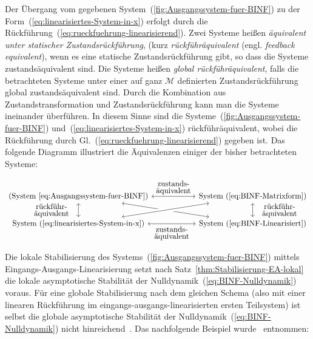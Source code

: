Der Übergang vom gegebenen System~(\ref{fig:Ausgangssystem-fuer-BINF})
zu der Form~(\ref{eq:linearisiertes-System-in-x}) erfolgt durch
die Rück\-führung~(\ref{eq:rueckfuehrung-linearisierend}). Zwei
Systeme heißen \emph{äquivalent unter statischer Zustandsrückführung},
(kurz \emph{rück\-führ\-äquivalent}
(engl. \emph{feed\-back equivalent}), wenn es eine statische Zustandsrückführung
gibt, so dass die Systeme zustandsäquivalent sind. Die Systeme heißen
\emph{global rück\-führ\-äquivalent}, falls die betrachteten Systeme
unter einer auf ganz $\mathcal{M}$ definierten Zustandsrückführung
global zustands\-äquivalent sind. Durch die Kombination aus Zustandstransformation
und Zustandsrückführung kann man die Systeme ineinander überführen.
In diesem Sinne sind die Systeme~(\ref{fig:Ausgangssystem-fuer-BINF})
und~(\ref{eq:linearisiertes-System-in-x}) rückführäquivalent, wobei
die Rückführung durch Gl.~(\ref{eq:rueckfuehrung-linearisierend})
gegeben ist. Das folgende Diagramm illustriert die Äquivalenzen einiger
der bisher betrachteten Systeme:

\[
\begin{tikzcd}
\text{(System~\ref{eq:Ausgangssystem-fuer-BINF})} 
\arrow[leftrightarrow]{rr}[above]{\stackrel{\textstyle\text{zustands-}}{\textstyle\text{äquivalent}}} 
\arrow[leftrightarrow]{d}[left]{\stackrel{\textstyle\text{rückführ-}}{\textstyle\text{äquivalent}}\quad} \arrow[rrd, leftrightarrow] 
& {} & \text{System~(\ref{eq:BINF-Matrixform})} 
\arrow[leftrightarrow]{d}[right]{\quad\stackrel{\textstyle\text{rückführ-}}{\textstyle\text{äquivalent}}}
\arrow[lld, leftrightarrow, crossing over]\\ 
\text{System~(\ref{eq:linearisiertes-System-in-x})} 
\arrow[leftrightarrow]{rr}[below]{\stackrel{\textstyle\text{zustands-}}{\textstyle\text{äquivalent}}} 
& {} & \text{System~(\ref{eq:BINF-Linearisiert})}
\end{tikzcd}
\]

Die lokale Stabilisierung des Systems~(\ref{fig:Ausgangssystem-fuer-BINF})
mittels Eingangs-Ausgangs-Linearisierung setzt nach Satz~\ref{thm:Stabilisierung-EA-lokal}
die lokale asymptotische Stabilität der Nulldynamik~(\ref{eq:BINF-Nulldynamik})
voraus. Für eine globale Stabilisierung nach dem gleichen Schema (also
mit einer linearen Rückführung im eingangs-ausgangs-linearisierten
ersten Teilsystem) ist selbst die globale asymptotische Stabilität
der Nulldynamik~(\ref{eq:BINF-Nulldynamik}) nicht hinreichend~\cite{sussmann1990}.
Das nachfolgende Beispiel wurde~\cite[Example~{4.2}]{sepulchre97}
entnommen:

